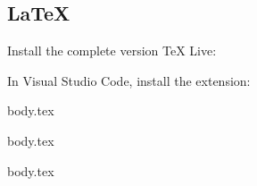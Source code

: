 \subsection{LaTeX}

Install the complete version TeX Live:


In Visual Studio Code, install the extension: 

\ifdefined\latexWorkshop
{body.tex}
\fi

\ifdefined\latexPackages
{body.tex}
\fi

\ifdefined\latexExtras
{body.tex}
\fi